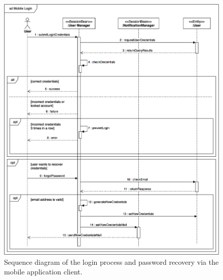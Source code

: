 \begin{figure}[H]
\begin{center}
		\includegraphics[width=\textwidth]{./arch_design/diagrams/login_mobile.png}
		\caption{Sequence diagram of the login process and password recovery via the mobile application client.}
		\label{login_sd}
\end{center}
\end{figure}

